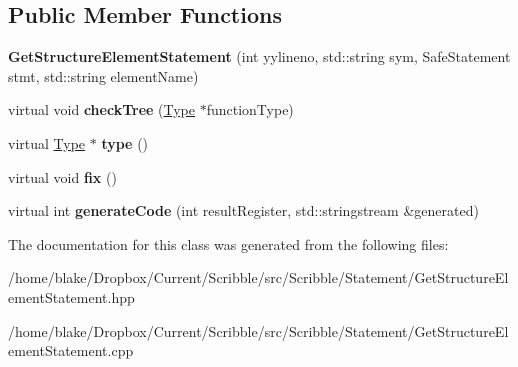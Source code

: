 \subsection*{Public Member Functions}
\begin{DoxyCompactItemize}
\item 
\hypertarget{class_scribble_core_1_1_get_structure_element_statement_ace2700ed36be23d2c5c7a6a1db118caa}{{\bfseries Get\-Structure\-Element\-Statement} (int yylineno, std\-::string sym, Safe\-Statement stmt, std\-::string element\-Name)}\label{class_scribble_core_1_1_get_structure_element_statement_ace2700ed36be23d2c5c7a6a1db118caa}

\item 
\hypertarget{class_scribble_core_1_1_get_structure_element_statement_a50b0c529a7b20c3b593bf25eca31cbed}{virtual void {\bfseries check\-Tree} (\hyperlink{class_scribble_core_1_1_type}{Type} $\ast$function\-Type)}\label{class_scribble_core_1_1_get_structure_element_statement_a50b0c529a7b20c3b593bf25eca31cbed}

\item 
\hypertarget{class_scribble_core_1_1_get_structure_element_statement_a067650790a16cda525f833e0026628d1}{virtual \hyperlink{class_scribble_core_1_1_type}{Type} $\ast$ {\bfseries type} ()}\label{class_scribble_core_1_1_get_structure_element_statement_a067650790a16cda525f833e0026628d1}

\item 
\hypertarget{class_scribble_core_1_1_get_structure_element_statement_a956597b81888a8a23e7fe0b7fb6efe0b}{virtual void {\bfseries fix} ()}\label{class_scribble_core_1_1_get_structure_element_statement_a956597b81888a8a23e7fe0b7fb6efe0b}

\item 
\hypertarget{class_scribble_core_1_1_get_structure_element_statement_abf03d398899bb7d6c33192eb3597d45d}{virtual int {\bfseries generate\-Code} (int result\-Register, std\-::stringstream \&generated)}\label{class_scribble_core_1_1_get_structure_element_statement_abf03d398899bb7d6c33192eb3597d45d}

\end{DoxyCompactItemize}


The documentation for this class was generated from the following files\-:\begin{DoxyCompactItemize}
\item 
/home/blake/\-Dropbox/\-Current/\-Scribble/src/\-Scribble/\-Statement/Get\-Structure\-Element\-Statement.\-hpp\item 
/home/blake/\-Dropbox/\-Current/\-Scribble/src/\-Scribble/\-Statement/Get\-Structure\-Element\-Statement.\-cpp\end{DoxyCompactItemize}

